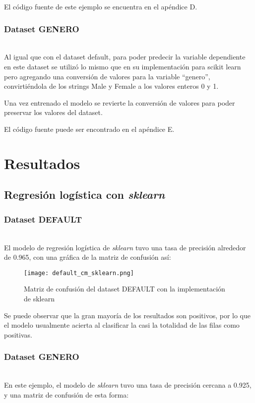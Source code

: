 \documentclass[sigconf,authorversion,nonacm]{acmart}
\begin{document}
El código fuente de este ejemplo se encuentra en el apéndice D.

\subsubsection{Dataset GENERO}\hfill\\
Al igual que con el dataset default, para poder predecir la variable dependiente en este dataset se utilizó lo mismo que en su implementación para scikit learn pero agregando una conversión de valores para la variable “genero”, convirtiéndola de los strings Male y Female a los valores enteros 0 y 1.

Una vez entrenado el modelo se revierte la conversión de valores para poder preservar los valores del dataset.

El código fuente puede ser encontrado en el apéndice E.

\section{Resultados}

\subsection{Regresión logística con \textit{sklearn}}

\subsubsection{Dataset DEFAULT}\hfill\\
El modelo de regresión logística de \textit{sklearn} tuvo una tasa de precisión alrededor de 0.965, con una gráfica de la matriz de confusión así:

\begin{figure}[H]
  \centering
  \texttt{[image: default\_cm\_sklearn.png]}
  \caption{Matriz de confusión del dataset DEFAULT con la implementación de sklearn}
\end{figure}

Se puede observar que la gran mayoría de los resultados son positivos, por lo que el modelo usualmente acierta al clasificar la casi la totalidad de las filas como positivas.

\subsubsection{Dataset GENERO}\hfill\\
En este ejemplo, el modelo de \textit{sklearn} tuvo una tasa de precisión cercana a 0.925, y una matriz de confusión de esta forma:
\end{document}

